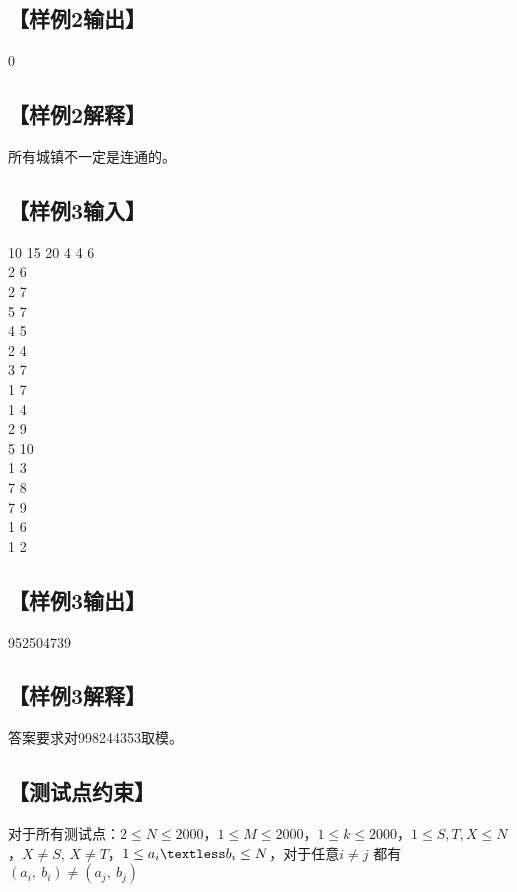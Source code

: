 \documentclass{statement}
\begin{document}
\subsection[样例2输出]{【样例2输出】}
\begin{example}
	0
\end{example}
   \subsection[样例2解释]{【样例2解释】}
	所有城镇不一定是连通的。
    \subsection[样例3输入]{【样例3输入】}
\begin{example}
10 15 20 4 4 6\\
2 6\\
2 7\\
5 7\\
4 5\\
2 4\\
3 7\\
1 7\\
1 4\\
2 9\\
5 10\\
1 3\\
7 8\\
7 9\\
1 6\\
1 2
\end{example}

\subsection[样例3输出]{【样例3输出】}
\begin{example}
	952504739
\end{example}
   \subsection[样例3解释]{【样例3解释】}
   答案要求对998244353取模。
    \subsection[测试点约束]{【测试点约束】}
    对于所有测试点：$ 2 \le N \le 2000 $，$ 1 \le M \le 2000 $，$ 1 \le k \le 2000 $，$ 1\le S,T,X \le N $，$ X \neq S $, $ X \neq T $，$ 1 \le a_i \textless b_i \le N $，对于任意$ i \neq j $ 都有 $ (a_i,\ b_i) \neq (a_j,\ b_j) $
\end{document}

